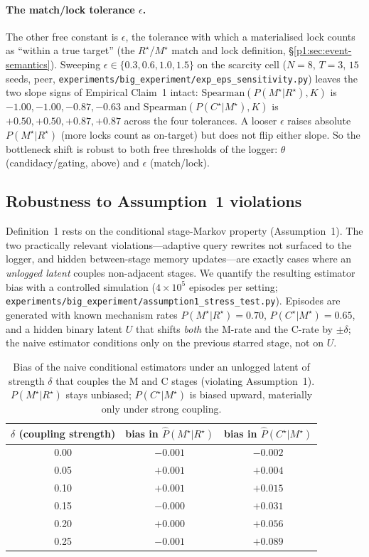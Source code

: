 \documentclass{article}
\newcommand{\method}[1]{\texttt{#1}}
\begin{document}
\paragraph{The match/lock tolerance $\epsilon$.} The other free constant is
$\epsilon$, the tolerance with which a materialised lock counts as ``within a
true target'' (the $R^\star$/$M^\star$ match and lock definition, \S\ref{p1:sec:event-semantics}).
Sweeping $\epsilon\in\{0.3,0.6,1.0,1.5\}$ on the scarcity cell ($N{=}8$, $T{=}3$,
$15$ seeds, peer, \method{experiments/big\_experiment/exp\_eps\_sensitivity.py})
leaves the two slope signs of Empirical Claim~1 intact: $\mathrm{Spearman}(P(M^\star|R^\star),K)$
is $-1.00,-1.00,-0.87,-0.63$ and $\mathrm{Spearman}(P(C^\star|M^\star),K)$ is
$+0.50,+0.50,+0.87,+0.87$ across the four tolerances. A looser $\epsilon$ raises
absolute $P(M^\star|R^\star)$ (more locks count as on-target) but does not flip
either slope. So the bottleneck shift is robust to both free thresholds of the
logger: $\theta$ (candidacy/gating, above) and $\epsilon$ (match/lock).

\subsection{Robustness to Assumption~1 violations}
\label{p1:app:assumption1-stress}

Definition~1 rests on the conditional stage-Markov property (Assumption~1). The two practically relevant violations---adaptive query rewrites not surfaced to the logger, and hidden between-stage memory updates---are exactly cases where an \emph{unlogged latent} couples non-adjacent stages. We quantify the resulting estimator bias with a controlled simulation ($4\!\times\!10^5$ episodes per setting; \method{experiments/big\_experiment/assumption1\_stress\_test.py}). Episodes are generated with known mechanism rates $P(M^\star|R^\star){=}0.70$, $P(C^\star|M^\star){=}0.65$, and a hidden binary latent $U$ that shifts \emph{both} the M-rate and the C-rate by $\pm\delta$; the naive estimator conditions only on the previous starred stage, not on $U$.

\begin{table}[h]
\caption{Bias of the naive conditional estimators under an unlogged latent of strength $\delta$ that couples the M and C stages (violating Assumption~1). $P(M^\star|R^\star)$ stays unbiased; $P(C^\star|M^\star)$ is biased upward, materially only under strong coupling.}
\label{p1:tab:assumption1-stress}
\centering
\small
\begin{tabular}{c c c}
\toprule
$\delta$ (coupling strength) & bias in $\hat P(M^\star|R^\star)$ & bias in $\hat P(C^\star|M^\star)$ \\
\midrule
0.00 & $-0.001$ & $-0.002$ \\
0.05 & $+0.001$ & $+0.004$ \\
0.10 & $+0.001$ & $+0.015$ \\
0.15 & $-0.000$ & $+0.031$ \\
0.20 & $+0.000$ & $+0.056$ \\
0.25 & $-0.001$ & $+0.089$ \\
\bottomrule
\end{tabular}
\end{table}
\end{document}
